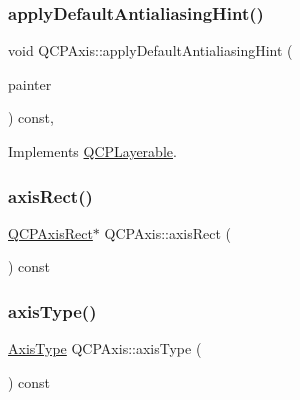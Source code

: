 \subsubsection{\texorpdfstring{apply\+Default\+Antialiasing\+Hint()}{applyDefaultAntialiasingHint()}}
{\footnotesize\ttfamily void Q\+C\+P\+Axis\+::apply\+Default\+Antialiasing\+Hint (\begin{DoxyParamCaption}\item[{\hyperlink{class_q_c_p_painter}{Q\+C\+P\+Painter} $\ast$}]{painter }\end{DoxyParamCaption}) const\hspace{0.3cm}{\ttfamily [protected]}, {\ttfamily [virtual]}}



Implements \hyperlink{class_q_c_p_layerable_afdf83ddc6a265cbf4c89fe99d3d93473}{Q\+C\+P\+Layerable}.

\mbox{\label{class_q_c_p_axis_afc94bcfdf8adfe8e01013f13bdf159a2}} 
\subsubsection{\texorpdfstring{axis\+Rect()}{axisRect()}}
{\footnotesize\ttfamily \hyperlink{class_q_c_p_axis_rect}{Q\+C\+P\+Axis\+Rect}$\ast$ Q\+C\+P\+Axis\+::axis\+Rect (\begin{DoxyParamCaption}{ }\end{DoxyParamCaption}) const\hspace{0.3cm}{\ttfamily [inline]}}

\mbox{\label{class_q_c_p_axis_aa19679359783c5ecd27757b7e5619976}} 
\subsubsection{\texorpdfstring{axis\+Type()}{axisType()}}
{\footnotesize\ttfamily \hyperlink{class_q_c_p_axis_ae2bcc1728b382f10f064612b368bc18a}{Axis\+Type} Q\+C\+P\+Axis\+::axis\+Type (\begin{DoxyParamCaption}{ }\end{DoxyParamCaption}) const\hspace{0.3cm}{\ttfamily [inline]}}

